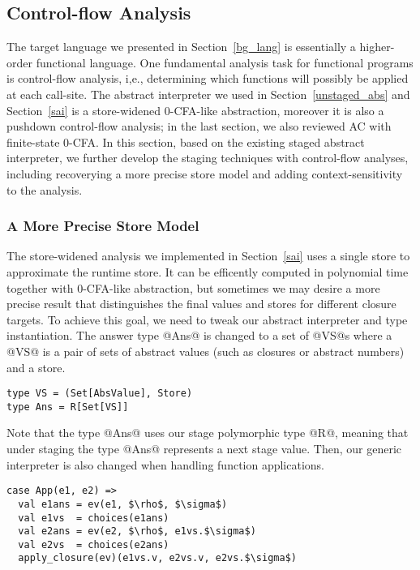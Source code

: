 \subsection{Control-flow Analysis} \label{cfa}

The target language we presented in Section~\ref{bg_lang} is essentially a
higher-order functional language. One fundamental analysis task for functional
programs is control-flow analysis, i,e., determining which functions will
possibly be applied at each call-site. The abstract interpreter we used in
Section~\ref{unstaged_abs} and Section~\ref{sai} is a store-widened 0-CFA-like
abstraction, moreover it is also a pushdown control-flow analysis; in the last
section, we also reviewed AC with finite-state 0-CFA. In this section, based on
the existing staged abstract interpreter, we further develop the staging
techniques with control-flow analyses, including recoverying a more precise
store model and adding context-sensitivity to the analysis.

\subsubsection{A More Precise Store Model}

The store-widened analysis we implemented in Section~\ref{sai} uses a single
store to approximate the runtime store. It can be efficently computed in
polynomial time together with 0-CFA-like abstraction, but sometimes we may
desire a more precise result that distinguishes the final values and stores for
different closure targets. To achieve this goal, we need to tweak our abstract
interpreter and type instantiation. The answer type @Ans@ is changed to a set of
@VS@s where a @VS@ is a pair of sets of abstract values (such as closures or
abstract numbers) and a store.

\begin{lstlisting}
type VS = (Set[AbsValue], Store)
type Ans = R[Set[VS]]
\end{lstlisting}

Note that the type @Ans@ uses our stage polymorphic type @R@, meaning that under
staging the type @Ans@ represents a next stage value. Then, our generic
interpreter is also changed when handling function applications.

\begin{lstlisting}
case App(e1, e2) =>
  val e1ans = ev(e1, $\rho$, $\sigma$)
  val e1vs  = choices(e1ans)
  val e2ans = ev(e2, $\rho$, e1vs.$\sigma$)
  val e2vs  = choices(e2ans)
  apply_closure(ev)(e1vs.v, e2vs.v, e2vs.$\sigma$)
\end{lstlisting}

